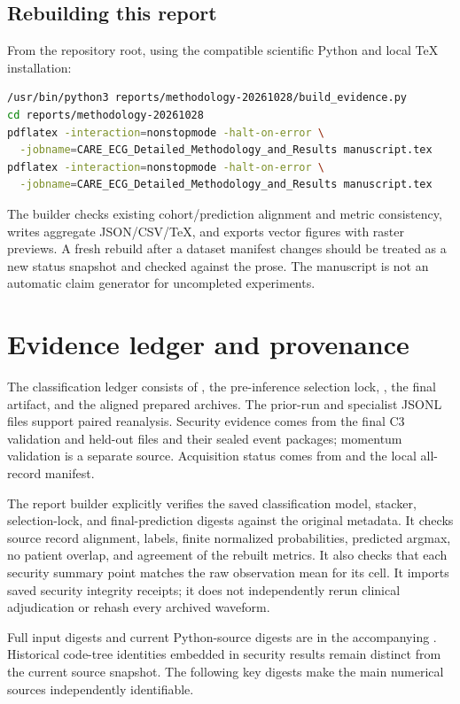 \subsection{Rebuilding this report}
From the repository root, using the compatible scientific Python and local TeX installation:
\begin{lstlisting}[language=bash]
/usr/bin/python3 reports/methodology-20261028/build_evidence.py
cd reports/methodology-20261028
pdflatex -interaction=nonstopmode -halt-on-error \
  -jobname=CARE_ECG_Detailed_Methodology_and_Results manuscript.tex
pdflatex -interaction=nonstopmode -halt-on-error \
  -jobname=CARE_ECG_Detailed_Methodology_and_Results manuscript.tex
\end{lstlisting}
The builder checks existing cohort/prediction alignment and metric consistency, writes aggregate JSON/CSV/TeX, and exports vector figures with raster previews. A fresh rebuild after a dataset manifest changes should be treated as a new status snapshot and checked against the prose. The manuscript is not an automatic claim generator for uncompleted experiments.

\section{Evidence ledger and provenance}
\label{app:provenance}
The classification ledger consists of , the pre-inference selection lock, , the final artifact, and the aligned prepared archives. The prior-run and specialist JSONL files support paired reanalysis. Security evidence comes from the final C3 validation and held-out  files and their sealed event packages; momentum validation is a separate source. Acquisition status comes from  and the local all-record manifest.

The report builder explicitly verifies the saved classification model, stacker, selection-lock, and final-prediction digests against the original metadata. It checks source record alignment, labels, finite normalized probabilities, predicted argmax, no patient overlap, and agreement of the rebuilt metrics. It also checks that each security summary point matches the raw observation mean for its cell. It imports saved security integrity receipts; it does not independently rerun clinical adjudication or rehash every archived waveform.

Full input digests and current Python-source digests are in the accompanying \code{evidence.json}. Historical code-tree identities embedded in security results remain distinct from the current source snapshot. The following key digests make the main numerical sources independently identifiable.


